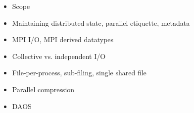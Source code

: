 



\begin{itemize}
    \item Scope
    \item Maintaining distributed state, parallel etiquette, metadata
    \item MPI I/O, MPI derived datatypes~\cite{thakur1998}
    \item Collective vs. independent I/O
    \item File-per-process, sub-filing, single shared file
    \item Parallel compression
    \item DAOS~\cite{soumagne2021}
\end{itemize}
